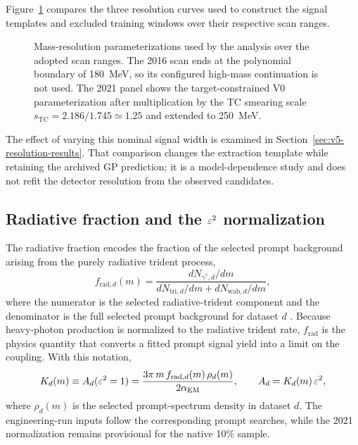 Figure~\ref{fig:mass-resolution-three-panel} compares the three resolution curves used
to construct the signal templates and excluded training windows over their respective
scan ranges.

\begin{figure}[H]
\centering
{}
\caption{Mass-resolution parameterizations used by the analysis over the adopted
scan ranges. The 2016 scan ends at the polynomial boundary of \SI{180}{MeV}, so its
configured high-mass continuation is not used. The 2021 panel shows the target-constrained V0 parameterization after
multiplication by the TC smearing scale $s_{\mathrm{TC}}=2.186/1.745\simeq1.25$ and
extended to \SI{250}{MeV}.}
\label{fig:mass-resolution-three-panel}
\end{figure}

The effect of varying this nominal signal width is examined in
Section~\ref{sec:v5-resolution-results}. That comparison changes the extraction
template while retaining the archived GP prediction; it is a model-dependence
study and does not refit the detector resolution from the observed candidates.

\subsection{Radiative fraction and the \texorpdfstring{$\varepsilon^2$}{epsilon2} normalization}
\label{sec:radfrac}

The radiative fraction encodes the fraction of the selected prompt background arising
from the purely radiative trident process,
\begin{equation}
f_{\mathrm{rad},d}(m)
=
\frac{dN_{\gamma^\ast,d}/dm}{dN_{\mathrm{tri},d}/dm + dN_{\mathrm{wab},d}/dm},
\label{eq:frad-def}
\end{equation}
where the numerator is the selected radiative-trident component and the denominator is
the full selected prompt background for dataset $d$
\cite{HPS2015DarkPhoton,HPS2016PromptLong}. Because heavy-photon production is
normalized to the radiative trident rate, $f_{\mathrm{rad}}$ is the physics quantity
that converts a fitted prompt signal yield into a limit on the coupling. With this
notation,
\begin{equation}
K_d(m) \equiv A_d(\varepsilon^2 = 1)
= \frac{3\pi\,m\,f_{\mathrm{rad},d}(m)\,\rho_d(m)}{2\alpha_{\mathrm{EM}}},
\qquad
A_d = K_d(m)\,\varepsilon^2,
\label{eq:kd-radfrac}
\end{equation}
where $\rho_d(m)$ is the selected prompt-spectrum density in dataset $d$. The
engineering-run inputs follow the corresponding prompt searches, while the 2021
normalization remains provisional for the native 10\% sample.

